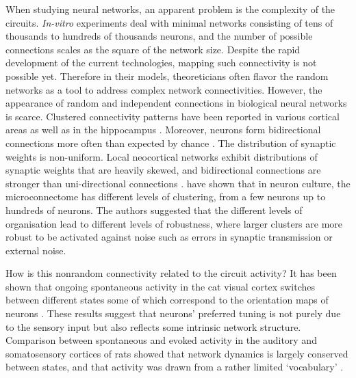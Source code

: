     When studying neural networks, an apparent problem is the complexity of the
    circuits. {\it In-vitro} experiments deal with minimal networks consisting
    of tens of thousands to hundreds of thousands neurons, and the number of
    possible connections scales as the square of the network size. Despite the
    rapid development of the current technologies, mapping such connectivity is
    not possible yet. Therefore in their models, theoreticians often flavor the
    random networks as a tool to address complex network connectivities.
    However, the appearance of random and independent connections in biological
    neural networks is scarce. Clustered connectivity patterns have been
    reported in various cortical areas \citep{Song2005, Ko2011, Perin2011,
    Shimono2015} as well as in the hippocampus \citep{Takahashi2010,
    Guzman2016}. Moreover, neurons form bidirectional connections more often
    than expected by chance \citep{Markram1997, Song2005, Takahashi2010,
    Ko2011, Perin2011}. The distribution of synaptic weights is non-uniform.
    Local neocortical networks exhibit distributions of synaptic weights that
    are heavily skewed, and bidirectional connections are stronger than
    uni-directional connections \citep{Markram1997, Song2005, Buzsaki2014}.
    \cite{Shimono2015} have shown that in neuron culture, the microconnectome
    has different levels of clustering, from a few neurons up to hundreds of
    neurons. The authors suggested that the different levels of organisation
    lead to different levels of robustness, where larger clusters are more
    robust to be activated against noise such as errors in synaptic
    transmission or external noise.

    How is this nonrandom connectivity related to the circuit activity? It has
    been shown that ongoing spontaneous activity in the cat visual cortex
    switches between different states some of which correspond to the
    orientation maps of neurons \citep{Kenet2003}. These results suggest that
    neurons' preferred tuning is not purely due to the sensory input but also
    reflects some intrinsic network structure. Comparison between spontaneous
    and evoked activity in the auditory and somatosensory cortices of rats
    showed that network dynamics is largely conserved between states, and that
    activity was drawn from a rather limited `vocabulary' \citep{Luczak2009,
    Luczak2012}.
    
